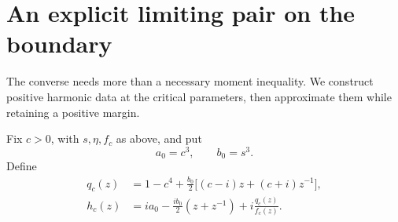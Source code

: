\documentclass[11pt]{article}
\theoremstyle{remark}\newtheorem{remark}[theorem]{Remark}
\begin{document}
\section{An explicit limiting pair on the boundary}
The converse needs more than a necessary moment inequality.
We construct positive harmonic data at the critical parameters,
then approximate them while retaining a positive margin.

Fix \(c>0\), with \(s,\eta,f_c\) as above, and put
\[
 a_0=c^3,\qquad b_0=s^3.
\]
Define
\begin{align}
 q_c(z)&=1-c^4+\frac{b_0}{2}
          \bigl[(c-i)z+(c+i)z^{-1}\bigr],\label{eq:q}\\
 h_c(z)&=ia_0-\frac{ib_0}{2}(z+z^{-1})
                    +i\frac{q_c(z)}{f_c(z)}.\label{eq:h}
\end{align}
\end{document}

